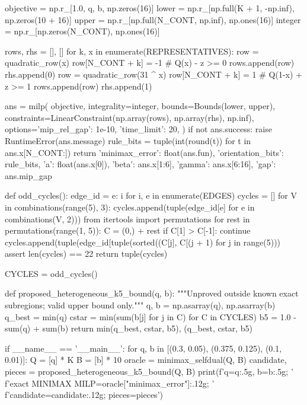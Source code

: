 \documentclass[11pt,a4paper]{ctexart}
\theoremstyle{definition}
\begin{document}
\begin{CodeListing}
    objective = np.r_[1.0, q, b, np.zeros(16)]
    lower = np.r_[np.full(K + 1, -np.inf), np.zeros(10 + 16)]
    upper = np.r_[np.full(N_CONT, np.inf), np.ones(16)]
    integer = np.r_[np.zeros(N_CONT), np.ones(16)]

    rows, rhs = [], []
    for k, x in enumerate(REPRESENTATIVES):
        row = quadratic_row(x)
        row[N_CONT + k] = -1  # Q(x) - z >= 0
        rows.append(row)
        rhs.append(0)
        row = quadratic_row(31 ^ x)
        row[N_CONT + k] = 1  # Q(1-x) + z >= 1
        rows.append(row)
        rhs.append(1)

    ans = milp(
        objective, integrality=integer,
        bounds=Bounds(lower, upper),
        constraints=LinearConstraint(np.array(rows), np.array(rhs), np.inf),
        options={'mip_rel_gap': 1e-10, 'time_limit': 20},
    )
    if not ans.success:
        raise RuntimeError(ans.message)
    rule_bits = tuple(int(round(t)) for t in ans.x[N_CONT:])
    return {'minimax_error': float(ans.fun),
            'orientation_bits': rule_bits,
            'a': float(ans.x[0]),
            'beta': ans.x[1:6],
            'gamma': ans.x[6:16],
            'gap': ans.mip_gap}


def odd_cycles():
    edge_id = {e: i for i, e in enumerate(EDGES)}
    cycles = []
    for V in combinations(range(5), 3):
        cycles.append(tuple(edge_id[e] for e in combinations(V, 2)))
    from itertools import permutations
    for rest in permutations(range(1, 5)):
        C = (0,) + rest
        if C[1] > C[-1]:
            continue
        cycles.append(tuple(edge_id[tuple(sorted((C[j], C[(j + 1) %
                            for j in range(5)))
    assert len(cycles) == 22
    return tuple(cycles)

CYCLES = odd_cycles()


def proposed_heterogeneous_k5_bound(q, b):
    """Unproved outside known exact subregions; valid upper bound only."""
    q, b = np.asarray(q), np.asarray(b)
    q_best = min(q)
    cstar = min(sum(b[j] for j in C) for C in CYCLES)
    b5 = 1.0 - sum(q) + sum(b)
    return min(q_best, cstar, b5), (q_best, cstar, b5)


if __name__ == '__main__':
    for q, b in [(0.3, 0.05), (0.375, 0.125), (0.1, 0.01)]:
        Q = [q] * K
        B = [b] * 10
        oracle = minimax_selfdual(Q, B)
        candidate, pieces = proposed_heterogeneous_k5_bound(Q, B)
        print(f'q={q:.5g}, b={b:.5g}; '
              f'exact MINIMAX MILP={oracle["minimax_error"]:.12g}; '
              f'candidate={candidate:.12g}; pieces={pieces}')
\end{CodeListing}
\end{document}
